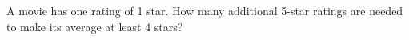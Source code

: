 A movie has one rating of 1 star. How many additional 5-star ratings are needed to make its average at least 4 stars?
